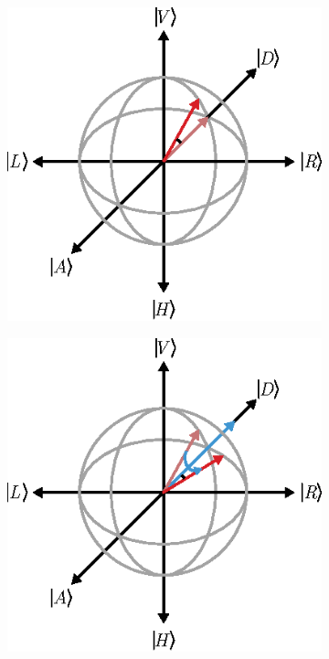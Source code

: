 \documentclass[PaulGanssle-Thesis.tex]{subfiles}
\begin{document}
\begin{figure}[ht!]
\begin{subfigure}[h]{0.3\tw}
\includegraphics[width=\tw]{figures/magnetometer/PC-Step3.eps}
\caption{}
\label{fig:PEMPCStep3}
\end{subfigure}
\newline
\begin{subfigure}[h]{0.3\tw}
\includegraphics[width=\tw]{figures/magnetometer/PC-Step4.eps}
\caption{}
\label{fig:PEMPCStep4}
\end{subfigure}
\begin{subfigure}[h]{0.3\tw}

\end{subfigure}
\end{figure}
\end{document}
